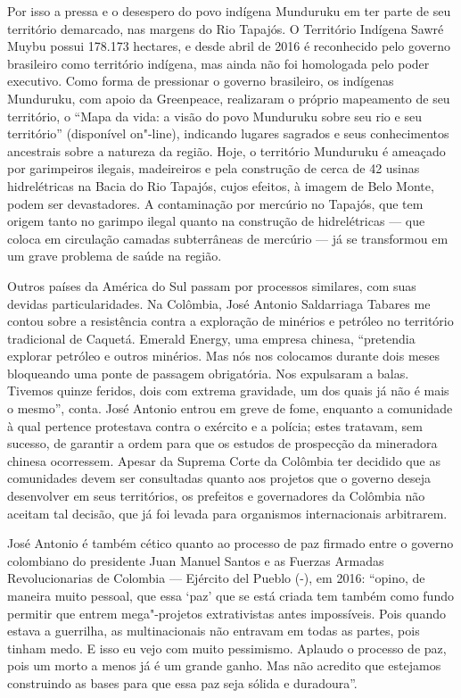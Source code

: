 Por isso a pressa e o desespero do povo indígena Munduruku em ter parte
de seu território demarcado, nas margens do Rio Tapajós. O Território
Indígena Sawré Muybu possui 178.173 hectares, e desde abril de 2016 é
reconhecido pelo governo brasileiro como território indígena,
mas ainda não foi homologada pelo poder executivo. Como forma de
pressionar o governo brasileiro, os indígenas Munduruku, com apoio da
 Greenpeace, realizaram o próprio mapeamento de seu
território, o ``Mapa da vida: a visão do povo Munduruku sobre seu rio e
seu território'' (disponível on"-line), indicando lugares sagrados e seus
conhecimentos ancestrais sobre a natureza da região. Hoje, o território
Munduruku é ameaçado por garimpeiros ilegais, madeireiros e pela
construção de cerca de 42 usinas hidrelétricas na Bacia do Rio Tapajós,
cujos efeitos, à imagem de Belo Monte, podem ser devastadores. A
contaminação por mercúrio no Tapajós, que tem origem tanto no garimpo
ilegal quanto na construção de hidrelétricas --- que coloca em circulação
camadas subterrâneas de mercúrio --- já se transformou em um grave
problema de saúde na região.

\asterisc

Outros países da América do Sul passam por processos similares, com suas
devidas particularidades. Na Colômbia, José Antonio Saldarriaga Tabares
me contou sobre a resistência contra a exploração de minérios e petróleo
no território tradicional de Caquetá. Emerald Energy, uma empresa
chinesa, ``pretendia explorar petróleo e outros minérios. Mas nós nos
colocamos durante dois meses bloqueando uma ponte de passagem
obrigatória. Nos expulsaram a balas. Tivemos quinze feridos, dois com
extrema gravidade, um dos quais já não é mais o mesmo'', conta. José
Antonio entrou em greve de fome, enquanto a comunidade à qual pertence
protestava contra o exército e a polícia; estes tratavam, sem sucesso,
de garantir a ordem para que os estudos de prospecção da mineradora
chinesa ocorressem. Apesar da Suprema Corte da Colômbia ter decidido que
as comunidades devem ser consultadas quanto aos projetos que o governo
deseja desenvolver em seus territórios, os prefeitos e governadores da
Colômbia não aceitam tal decisão, que já foi levada para organismos
internacionais arbitrarem.

José Antonio é também cético quanto ao processo de paz firmado entre o
governo colombiano do presidente Juan Manuel Santos e as Fuerzas Armadas Revolucionarias de Colombia --- Ejército del Pueblo (-), em 2016:
``opino, de maneira muito pessoal, que essa `paz' que se está criada
tem também como fundo permitir que entrem mega"-projetos extrativistas
antes impossíveis. Pois quando estava a guerrilha, as multinacionais não
entravam em todas as partes, pois tinham medo. E isso eu vejo com muito
pessimismo. Aplaudo o processo de paz, pois um morto a menos já é um
grande ganho. Mas não acredito que estejamos construindo as bases para
que essa paz seja sólida e duradoura''.

